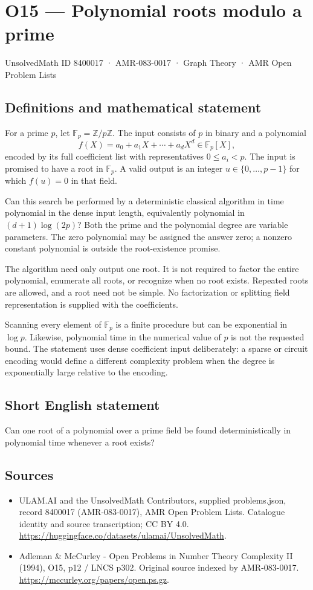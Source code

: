 \documentclass[11pt,a4paper]{article}
\begin{document}
\section*{O15 — Polynomial roots modulo a prime}\label{8400017}
{\small UnsolvedMath ID 8400017 · AMR-083-0017 · Graph Theory · AMR Open Problem Lists}
\subsection{Definitions and mathematical statement}
For a prime $p$, let $\mathbb F_p=\mathbb Z/p\mathbb Z$. The input consists of $p$ in binary and a polynomial
\[
f(X)=a_0+a_1X+\cdots+a_dX^d\in\mathbb F_p[X],
\]
encoded by its full coefficient list with representatives $0\le a_i<p$. The input is promised to have a root in $\mathbb F_p$. A valid output is an integer $u\in\{0,\ldots,p-1\}$ for which $f(u)=0$ in that field.

Can this search be performed by a deterministic classical algorithm in time polynomial in the dense input length, equivalently polynomial in $(d+1)\log(2p)$? Both the prime and the polynomial degree are variable parameters. The zero polynomial may be assigned the answer zero; a nonzero constant polynomial is outside the root-existence promise.

The algorithm need only output one root. It is not required to factor the entire polynomial, enumerate all roots, or recognize when no root exists. Repeated roots are allowed, and a root need not be simple. No factorization or splitting field representation is supplied with the coefficients.

Scanning every element of $\mathbb F_p$ is a finite procedure but can be exponential in $\log p$. Likewise, polynomial time in the numerical value of $p$ is not the requested bound. The statement uses dense coefficient input deliberately: a sparse or circuit encoding would define a different complexity problem when the degree is exponentially large relative to the encoding.
\subsection{Short English statement}
Can one root of a polynomial over a prime field be found deterministically in polynomial time whenever a root exists?
\subsection{Sources}
\begin{itemize}
\item[S1] ULAM.AI and the UnsolvedMath Contributors, supplied problems.json, record 8400017 (AMR-083-0017), AMR Open Problem Lists. Catalogue identity and source transcription; CC BY 4.0.
\url{https://huggingface.co/datasets/ulamai/UnsolvedMath}.
\item[S2] Adleman \& McCurley - Open Problems in Number Theory Complexity II (1994), O15, p12 / LNCS p302. Original source indexed by AMR-083-0017.
\url{https://mccurley.org/papers/open.ps.gz}.
\end{itemize}
\end{document}
